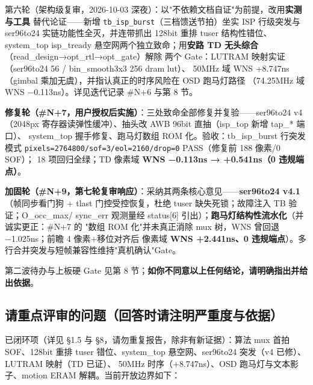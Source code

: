 \documentclass[10pt]{ctexart}
\newcommand{\code}[1]{\texttt{#1}}
\begin{document}
第六轮（架构级复审，2026-10-03 深夜）：以"不依赖文档自证"为前提，改用\textbf{实测与工具}
替代论证——新增 \code{tb\_isp\_burst}（三档馈送节拍）坐实 ISP 行级突发与 ser96to24
实链功能性全灭，并连带抓出 128bit 重排 tuser 结构性错位、system\_top isp\_tready
悬空网两个独立致命；用\textbf{安路 TD 无头综合}（read\_design→opt\_rtl→opt\_gate）解除
两个 Gate：LUTRAM 映射实证（ser96to24 56 / bin\_smooth3x3 256 dram lut）、
50MHz 域 WNS +8.747ns（gimbal 乘加无虞），并指认真正的时序风险在 OSD 跑马灯路径
（74.25MHz 域 WNS −0.113ns）。详见迭代记录 \#N+6 与第 8 节。

\textbf{修复轮（\#N+7，用户授权后实施）}：三处致命全部修复并复验——ser96to24 v4
（2048px 寄存器读弹性缓冲）、抽头改 AWB 96bit 直抽（isp\_top 新增 tap\_* 端口）、
system\_top 握手修复、跑马灯数组 ROM 化。验收：tb\_isp\_burst 行突发模式
\code{pixels=2764800/sof=3/eol=2160/drop=0} PASS（修复前 188 像素/0 SOF）；
18 项回归全绿；TD 像素域 \textbf{WNS −0.113ns → +0.541ns（0 违规端点）}。

\textbf{加固轮（\#N+9，第七轮复审响应）}：采纳其两条核心意见——\textbf{ser96to24 v4.1}
（帧同步看门狗 + tlast 门控受控恢复，杜绝 tuser 缺失死锁；故障注入 TB 验证；O\_occ\_max/
sync\_err 观测量经 status[6] 引出）；\textbf{跑马灯结构性流水化}（并诚实更正：\#N+7 的
"数组 ROM 化"并未真正消除 mux 树，WNS 曾回退 −1.025ns；前瞻 4 像素+移位对齐后
像素域 \textbf{WNS +2.441ns、0 违规端点}）。多行合并突发与短帧兼容性维持"真机确认"Gate。

第二波待办与上板硬 Gate 见第 8 节；\textbf{如你不同意以上任何结论，请明确指出并给出依据}。

\subsection{请重点评审的问题（回答时请注明严重度与依据）}

已闭环项（详见 §1.5 与 §8，请勿重复报告，除非有新证据）：算法 mux 首拍 SOF、128bit 重排
tuser 错位、system\_top 悬空网、ser96to24 突发（v4 已修）、LUTRAM 映射（TD 已证）、
50MHz 时序（+8.747ns）、OSD 跑马灯与文本影子、motion ERAM 解耦。当前开放边界如下：
\end{document}
